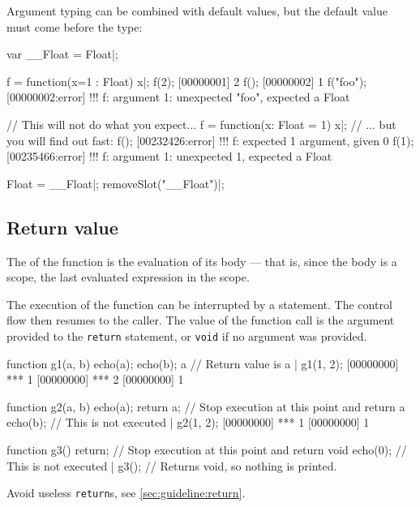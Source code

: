 Argument typing can be combined with default values, but the default value
must come before the type:

\begin{urbicomment}
var __Float = Float|;
\end{urbicomment}

\begin{urbiscript}
f = function(x=1 : Float) {x}|;
f(2);
[00000001] 2
f();
[00000002] 1
f("foo");
[00000002:error] !!! f: argument 1: unexpected "foo", expected a Float

// This will not do what you expect...
f = function(x: Float = 1) {x}|;
// ... but you will find out fast:
f();
[00232426:error] !!! f: expected 1 argument, given 0
f(1);
[00235466:error] !!! f: argument 1: unexpected 1, expected a Float
\end{urbiscript}

\begin{urbicomment}
Float = __Float|;
removeSlot("__Float")|;
\end{urbicomment}

\subsection{Return value}
\label{sec:lang:rv}
The  of the function is the
evaluation of its body --- that is, since the body is a scope, the last
evaluated expression in the scope.

The execution of the function can be interrupted by a 
statement.  The control flow then resumes to the caller.  The value of the
function call is the argument provided to the \lstinline{return} statement,
or \lstinline{void} if no argument was provided.

\begin{urbiscript}
function g1(a, b)
{
  echo(a);
  echo(b);
  a // Return value is a
}|
g1(1, 2);
[00000000] *** 1
[00000000] *** 2
[00000000] 1

function g2(a, b)
{
  echo(a);
  return a; // Stop execution at this point and return a
  echo(b); // This is not executed
}|
g2(1, 2);
[00000000] *** 1
[00000000] 1

function g3()
{
  return; // Stop execution at this point and return void
  echo(0); // This is not executed
}|
g3(); // Returns void, so nothing is printed.
\end{urbiscript}

Avoid useless \lstinline{return}s, see \autoref{sec:guideline:return}.

